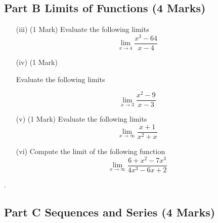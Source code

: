 \documentclass[11pt]{article} %
\begin{document}
\subsection*{Part B Limits of Functions (4 Marks)}


\begin{itemize}
\item[(iii)](1 Mark)
Evaluate the following limits
\[  \lim_{x\to 4} \frac{x^3-64}{x-4}      \]

\vspace{2cm}
\item[(iv)](1 Mark)

Evaluate the following limits

\[\lim_{x \to 3 } \frac{x^2-9}{x-3}\]  %

\end{itemize}




%
%

\newpage

\begin{enumerate}
%	
%	
	\item[(v)](1 Mark)
	Evaluate the following limits
	\[  \lim_{x\to \infty } \frac{x+1}{x^2+x}      \] \vspace{2cm}
	\item[(vi)]  Compute the limit of the following function
	\[ \lim_{x \to \infty } \frac{6 + x^2 - 7x^3 }{4x^3 - 6x + 2} \]	
	
\end{enumerate}
\newpage
.
\newpage
\subsection*{Part C Sequences and Series (4 Marks)}
\end{document}
